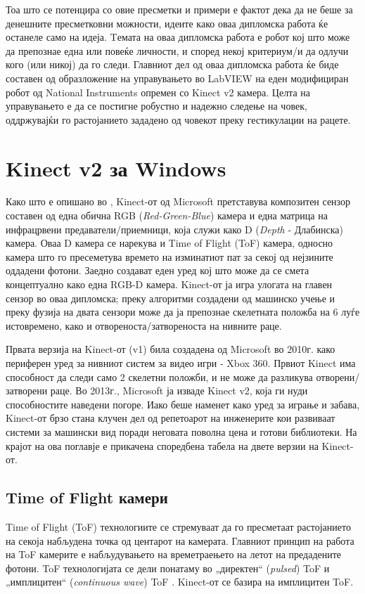 \documentclass[12pt]{article}
\begin{document}
  Тоа што се потенцира со овие пресметки и примери е фактот дека да не беше за денешните пресметковни можности, идеите како оваа дипломска работа ќе останеле само на идеја.
  \bigbreak
  Tемата на оваа дипломска работа е робот кој што може да препознае една или повеќе личности, и според некој критериум/и да одлучи кого (или никој) да го следи.
  Главниот дел од оваа дипломска работа ќе биде составен од образложение на управувањето во LabVIEW на еден модифициран робот од National Instruments опремен со Kinect v2 камера. Целта на управувањето е да се постигне робустно и надежно следење на човек, оддржувајќи го растојанието зададено од човекот преку гестикулации на рацете.
  \\

\newpage

\section{Kinect v2 за Windows}
	Како што е опишано во \cite{wassenmuller}, Kinect-от од Microsoft претставува композитен сензор составен од една обична RGB (\textit{Red-Green-Blue}) камера и една матрица на инфрацрвени предаватели/приемници, која служи како D (\textit{Depth} - Длабинска) камера. Оваа D камера се нарекува и Time of Flight (ToF) камера, односно камера што го пресеметува времето на изминатиот пат за секој од нејзините оддадени фотони. Заедно создават еден уред кој што може да се смета концептуално како една RGB-D камера. Kinect-от ја игра улогата на главен сензор во оваа дипломска; преку алгоритми создадени од машинско учење и преку фузија на двата сензори може да ја препознае скелетната положба на 6 луѓе истовремено, како и отвореноста/затвореноста на нивните раце.

	Првата верзија на Kinect-от (v1) била создадена од Microsoft во 2010г. како периферен уред за нивниот систем за видео игри - Xbox 360. Првиот Kinect има способност да следи само 2 скелетни положби, и не може да разликува отворени/затворени раце. Во 2013г., Microsoft ја изваде Kinect v2, која ги нуди способностите наведени погоре. Иако беше наменет како уред за играње и забава, Kinect-от брзо стана клучен дел од репетоарот на инженерите кои развиваат системи за машински вид поради неговата поволна цена и готови библиотеки. На крајот на ова поглавје е прикачена споредбена табела на двете верзии на Kinect-от.
  \subsection{Time of Flight камери}
  	Time of Flight (ToF) технологиите се стремуваат да го пресметаат растојанието на секоја набљудена точка од центарот на камерата. Главниот принцип на работа на ToF камерите е набљудувањето на времетраењето на летот на предадените фотони. ToF технологијата се дели понатаму во „директен“ (\textit{pulsed}) ToF и „имплицитен“ (\textit{continuous wave}) ToF \cite{tofwhitepaper}. Kinect-от се базира на имплицитен ToF.
\end{document}

